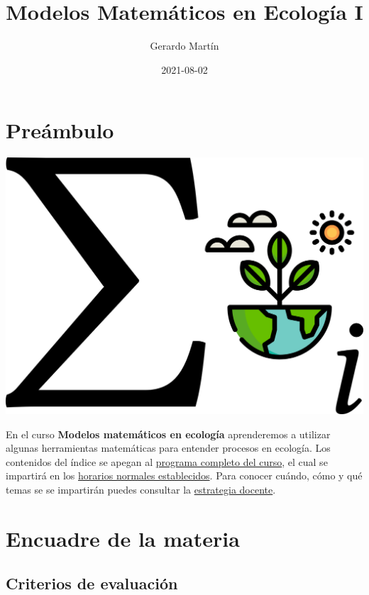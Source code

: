 \documentclass[
]{book}
\title{Modelos Matemáticos en Ecología I}
\author{Gerardo Martín}
\date{2021-08-02}
\begin{document}
\maketitle

{
\setcounter{tocdepth}{1}
\tableofcontents
}
\hypertarget{preuxe1mbulo}{%
\chapter{Preámbulo}\label{preuxe1mbulo}}

\begin{center}\includegraphics[width=20.83in]{logo} \end{center}

En el curso \textbf{Modelos matemáticos en ecología} aprenderemos a utilizar algunas herramientas matemáticas para entender procesos en ecología. Los contenidos del índice se apegan al \href{Programa-curso.pdf}{programa completo del curso}, el cual se impartirá en los \href{Horario.pdf}{horarios normales establecidos}. Para conocer cuándo, cómo y qué temas se se impartirán puedes consultar la \href{Estrategia-docente.pdf}{estrategia docente}.

\hypertarget{encuadre-de-la-materia}{%
\chapter{Encuadre de la materia}\label{encuadre-de-la-materia}}

\hypertarget{criterios-de-evaluaciuxf3n}{%
\section{Criterios de evaluación}\label{criterios-de-evaluaciuxf3n}}
\end{document}
